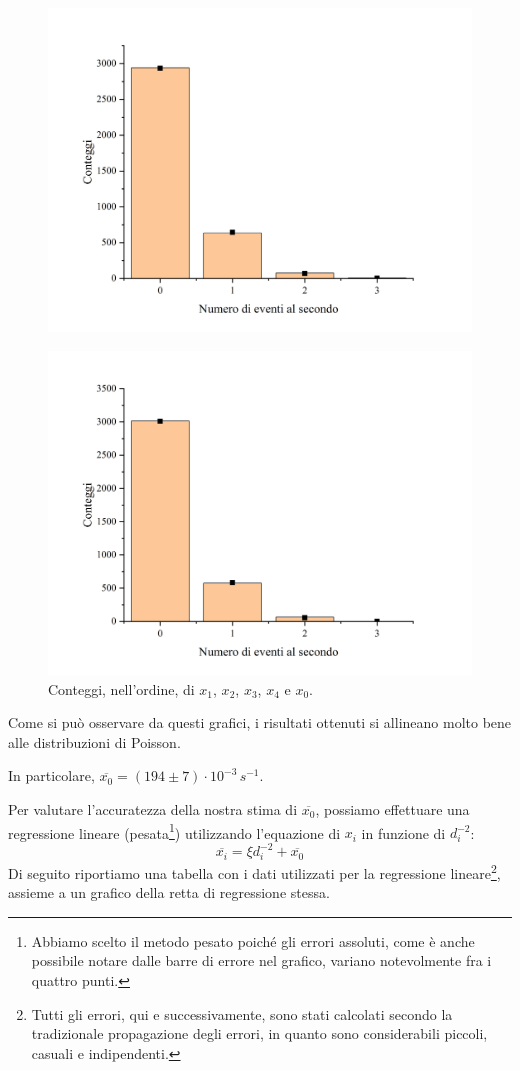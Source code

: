 \documentclass{article}
\begin{document}
\begin{center}
\begin{figure}[H]
        \includegraphics[trim={2cm .5cm 2.4cm 2.1cm},clip,width=.5\textwidth]{img/Geiger5.jpg}
    \end{figure}\begin{figure}[H]
        \centering
        \includegraphics[trim={2cm .5cm 2.4cm 2.1cm},clip,width=.5\textwidth]{img/Geiger0.jpg}
        \caption*{Conteggi, nell'ordine, di $x_1$, $x_2$, $x_3$, $x_4$ e $x_0$.}
    \end{figure}
\end{center}

Come si può osservare da questi grafici, i risultati ottenuti si allineano molto bene
alle distribuzioni di Poisson.

In particolare, $\overline{x_0} = \left(194\pm7\right)\cdot10^{-3}\,\unit{s^{-1}}$.

Per valutare l'accuratezza della nostra stima di $\overline{x_0}$, possiamo effettuare
una regressione lineare (pesata\footnote{
    Abbiamo scelto il metodo pesato poiché gli errori assoluti,
    come è anche possibile notare dalle barre di errore nel grafico,
    variano notevolmente fra i quattro punti.
}) utilizzando l'equazione di $x_i$ in funzione di
$d_i^{-2}$: \[\overline{x_i} = \xi d_i^{-2} + \overline{x_0}\]
Di seguito riportiamo una tabella con i dati utilizzati per la regressione lineare\footnote{
    Tutti gli errori, qui e successivamente, sono stati calcolati secondo la tradizionale
    propagazione degli errori, in quanto sono considerabili piccoli, casuali e indipendenti.
}, assieme a un grafico della retta di regressione stessa.
\end{document}
